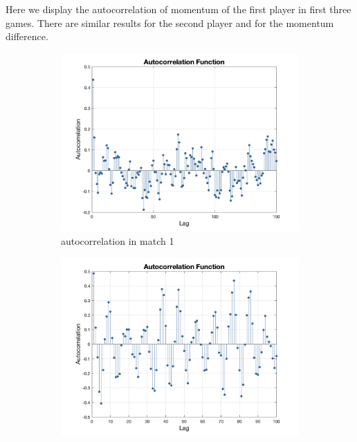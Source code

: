 Here we display the autocorrelation of momentum of the first player in first three games.
There are similar results for the second player and for the momentum difference.

\begin{figure}[H]
    \centering
    \begin{subfigure}[b]{0.34\textwidth}
        \includegraphics[width=\linewidth]{mainmatter/imgs/momen_selfco_1.png}
        \caption{autocorrelation in match 1}
    \end{subfigure}\hspace{-0.02\textwidth}
    \begin{subfigure}[b]{0.34\textwidth}
        \includegraphics[width=\linewidth]{mainmatter/imgs/momen_selfco_2.png}

\end{subfigure}
\end{figure}

